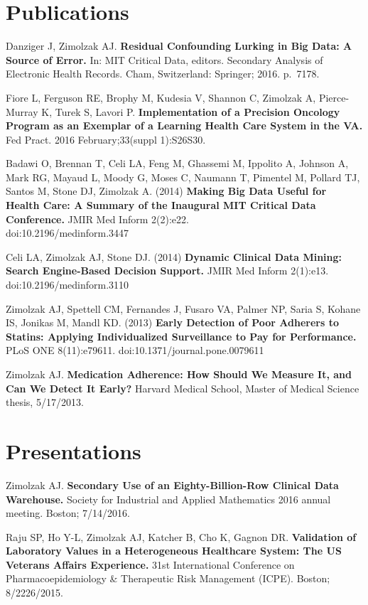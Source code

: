 \documentclass[10pt]{article}
\begin{document}
\section*{Publications}

Danziger J, Zimolzak AJ. \textbf{Residual Confounding Lurking in Big
  Data: A Source of Error.} In: MIT Critical Data, editors. Secondary
Analysis of Electronic Health Records. Cham, Switzerland: Springer;
2016. p.\ 71\ndash{}78.

Fiore L, Ferguson RE, Brophy M, Kudesia V, Shannon C, Zimolzak A,
Pierce-Murray K, Turek S, Lavori P. \textbf{Implementation of a
  Precision Oncology Program as an Exemplar of a Learning Health Care
  System in the VA.} Fed Pract. 2016 February;33(suppl
1):S26\ndash{}S30.

Badawi O, Brennan T, Celi LA, Feng M, Ghassemi M, Ippolito A, Johnson
A, Mark RG, Mayaud L, Moody G, Moses C, Naumann T, Pimentel M, Pollard
TJ, Santos M, Stone DJ, Zimolzak A. (2014) \textbf{Making Big Data
  Useful for Health Care: A Summary of the Inaugural MIT Critical Data
  Conference.} JMIR Med Inform 2(2):e22.\\
doi:10.2196/medinform.3447

Celi LA, Zimolzak AJ, Stone DJ. (2014) \textbf{Dynamic Clinical Data
  Mining: Search Engine-Based Decision Support.} JMIR Med Inform
2(1):e13. doi:10.2196/medinform.3110

Zimolzak AJ, Spettell CM, Fernandes J, Fusaro VA, Palmer NP, Saria S,
Kohane IS, Jonikas M, Mandl KD. (2013) \textbf{Early Detection of Poor
  Adherers to Statins: Applying Individualized Surveillance to Pay for
  Performance.} PLoS ONE 8(11):e79611.
doi:10.1371/journal.pone.0079611

Zimolzak AJ. \textbf{Medication Adherence: How Should We Measure It,
  and Can We Detect It Early?} Harvard Medical School, Master of
Medical Science thesis, 5/17/2013.

\section*{Presentations} %

Zimolzak AJ. \textbf{Secondary Use of an Eighty-Billion-Row Clinical
  Data Warehouse.} Society for Industrial and Applied Mathematics 2016
annual meeting. Boston; 7/14/2016.

Raju SP, Ho Y-L, Zimolzak AJ, Katcher B, Cho K, Gagnon DR.
\textbf{Validation of Laboratory Values in a Heterogeneous Healthcare
  System: The US Veterans Affairs Experience.} 31st International
Conference on Pharmacoepidemiology \& Therapeutic Risk Management
(ICPE). Boston; 8/22\ndash{}26/2015.
\end{document}
